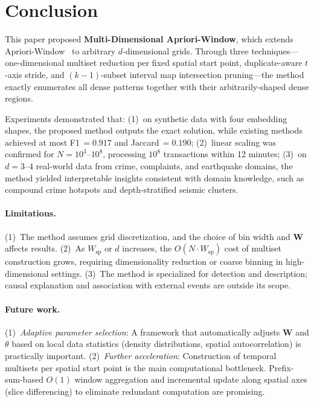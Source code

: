 \section{Conclusion}\label{sec:conclusion}

This paper proposed \textbf{Multi-Dimensional Apriori-Window},
which extends Apriori-Window~\cite{aprioriwindow}
to arbitrary $d$-dimensional grids.
Through three techniques---one-dimensional multiset reduction
per fixed spatial start point,
duplicate-aware $t$-axis stride,
and $(k{-}1)$-subset interval map intersection pruning---the method
exactly enumerates all dense patterns
together with their arbitrarily-shaped dense regions.

Experiments demonstrated that:
(1)~on synthetic data with four embedding shapes,
the proposed method outputs the exact solution,
while existing methods achieved at most
F1\,$=0.917$ and Jaccard\,$=0.190$;
(2)~linear scaling was confirmed
for $N = 10^3$--$10^8$,
processing $10^8$ transactions within 12 minutes;
(3)~on $d{=}3$--$4$ real-world data from crime, complaints,
and earthquake domains,
the method yielded interpretable insights
consistent with domain knowledge,
such as compound crime hotspots
and depth-stratified seismic clusters.

\paragraph{Limitations.}
(1)~The method assumes grid discretization,
and the choice of bin width and $\bm{W}$ affects results.
(2)~As $W_{\mathrm{sp}}$ or $d$ increases,
the $O(N \cdot W_{\mathrm{sp}})$ cost of multiset construction grows,
requiring dimensionality reduction or coarse binning
in high-dimensional settings.
(3)~The method is specialized for detection and description;
causal explanation and association with external events
are outside its scope.

\paragraph{Future work.}
(1)~\emph{Adaptive parameter selection}:
A framework that automatically adjusts $\bm{W}$ and $\theta$
based on local data statistics
(density distributions, spatial autocorrelation)
is practically important.
(2)~\emph{Further acceleration}:
Construction of temporal multisets per spatial start point
is the main computational bottleneck.
Prefix-sum-based $O(1)$ window aggregation
and incremental update along spatial axes (slice differencing)
to eliminate redundant computation are promising.
